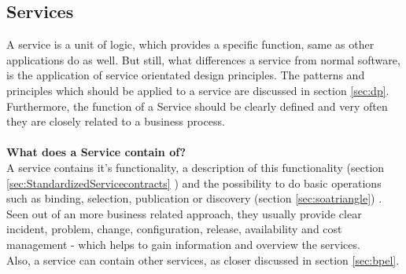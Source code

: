 \documentclass[12pt]{article}
\begin{document}
\subsection{Services} \label{sec:service}
A service is a unit of logic, which provides a specific function, same as other applications do as well. But still, what differences a service from normal software, is the application of service orientated design principles. The patterns and principles which should be applied to a service are discussed in section \ref{sec:dp}. \\Furthermore, the function of a Service should be clearly defined and very often they are closely related to a business process.  \cite{searchsoa}\cite[page 29]{grau} \\\\
\textbf{What does a Service contain of?}\\
A service contains it's functionality, a description of this functionality (section \ref{sec:StandardizedServicecontracts} ) and the possibility to do basic operations such as binding, selection, publication or discovery (section \ref{sec:soatriangle}) \cite[page 8]{soagoesreal}. \\
Seen out of an more business related approach, they usually provide clear incident, problem, change, configuration, release, availability and cost management - which helps to gain information and overview the services.\\
Also, a service can contain other services, as closer discussed in section \ref{sec:bpel}.
\end{document}
